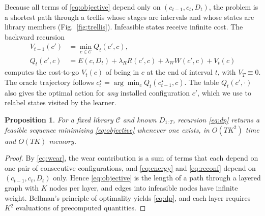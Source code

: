 \documentclass[preprint,12pt]{elsarticle}
\newtheorem{proposition}{Proposition}
\begin{document}
Because all terms of \eqref{eq:objective} depend only on $(c_{t-1},c_t,D_t)$, the problem is a shortest path through a trellis whose stages are intervals and whose states are library members (Fig.~\ref{fig:trellis}). Infeasible states receive infinite cost. The backward recursion
\begin{equation}\label{eq:dp}
\begin{aligned}V_{t-1}(c')&=\min_{c\in\mathcal{C}}Q_t(c',c),\\
Q_t(c',c)&=E(c,D_t)+\lambda_R R(c',c)+\lambda_W W(c',c)+V_t(c)\end{aligned}
\end{equation}
computes the cost-to-go $V_t(c)$ of being in $c$ at the end of interval $t$, with $V_T\equiv0$. The oracle trajectory follows $c^\star_t=\arg\min_c Q_t(c^\star_{t-1},c)$. The table $Q_t(c',\cdot)$ also gives the optimal action for \emph{any} installed configuration $c'$, which we use to relabel states visited by the learner.

\begin{proposition}\label{prop:dp}
For a fixed library $\mathcal{C}$ and known $D_{1:T}$, recursion \eqref{eq:dp} returns a feasible sequence minimizing \eqref{eq:objective} whenever one exists, in $O(TK^2)$ time and $O(TK)$ memory.
\end{proposition}
\begin{proof}
By \eqref{eq:wear}, the wear contribution is a sum of terms that each depend on one pair of consecutive configurations, and \eqref{eq:energy} and \eqref{eq:reconf} depend on $(c_{t-1},c_t,D_t)$ only. Hence \eqref{eq:objective} is the length of a path through a layered graph with $K$ nodes per layer, and edges into infeasible nodes have infinite weight. Bellman's principle of optimality yields \eqref{eq:dp}, and each layer requires $K^2$ evaluations of precomputed quantities.
\end{proof}
\end{document}
